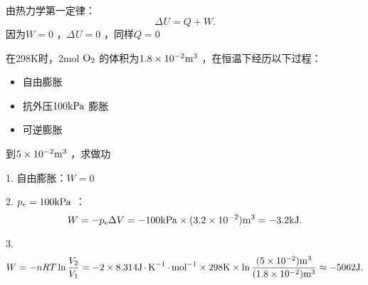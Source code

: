 由热力学第一定律：\[
    \Delta_\text{}U = Q+W 
.\]
因为$W=0$ ，$\Delta_\text{}U = 0 $ ，同样$Q=0$ 
\begin{eg}
    在298K时，2mol  $\ce{O_2}$ 的体积为$1.8\times 10^{-2}\ce{m}^{3}$ ，在恒温下经历以下过程：
    \begin{itemize}
        \item 自由膨胀
        \item 抗外压$100\ce{kPa}$ 膨胀
        \item 可逆膨胀
        
    \end{itemize}
    到$5\times 10^{-2}\ce{m}^{3}$ ，求做功
\end{eg}
\begin{sol}
    1. 自由膨胀：$W=0$ 

    2. $p_\text{e}=100\ce{kPa}$ ：\[
        W = -p_\text{e}\Delta V = -100\ce{kPa}\times (3.2\times 10^{-2})\ce{m}^{3} = -3.2\ce{kJ}
    .\]

    3. \[
        W = -nRT \ln \frac{V_2}{V_1} = -2\times 8.314\ce{J*K^{-1}*mol^{-1}} \times 298\ce{K} \times \ln \frac{(5\times 10^{-2}) \ce{m}^{3}}{(1.8\times 10^{-2}) \ce{m}^{3}} \approx -5062\ce{J}
    .\]
\end{sol} 

